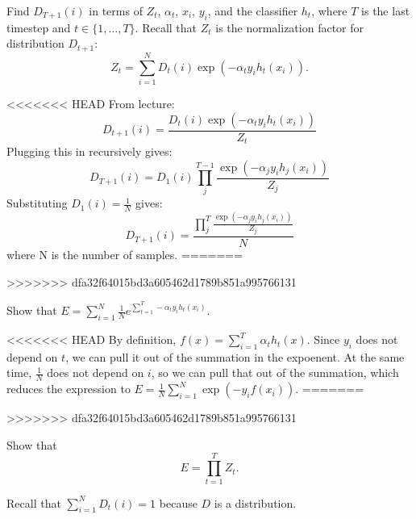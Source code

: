\problem[3]
Find $D_{T + 1}(i)$ in terms of $Z_t$, $\alpha_t$, $x_i$, $y_i$, and the classifier $h_t$, where $T$ is the last timestep and $t \in \{1, \ldots, T\}$. Recall that $Z_t$ is the normalization factor for distribution $D_{t+1}$:
$$Z_t = \sum\limits_{i=1}^N D_t(i) \exp(-\alpha_{t}y_{i}h_{t}(x_{i})).$$

\begin{solution}
<<<<<<< HEAD
     From lecture:
     \begin{equation}
         D_{t+1}(i) = \frac{D_t(i)\exp{(-\alpha_ty_ih_t(x_i))}}{Z_t}
     \end{equation}
     Plugging this in recursively gives:
    \begin{equation}
        D_{T+1}(i) =D_1(i)\prod_j^{T-1}\frac{\exp{(-\alpha_jy_ih_j(x_i))}}{Z_j}
    \end{equation}
    Substituting $D_1(i)=\frac{1}{N}$ gives:
    \begin{equation}
        D_{T+1}(i) =\frac{\prod_j^{T}\frac{\exp{(-\alpha_jy_ih_j(x_i))}}{Z_j}}{N}
    \end{equation}
    where N is the number of samples.
=======

>>>>>>> dfa32f64015bd3a605462d1789b851a995766131
\end{solution}

\problem[2]
Show that $E = \sum_{i=1}^N  \frac{1}{N} e^{\sum_{t=1}^T -\alpha_t y_i h_t(x_i)}.$

\begin{solution}
<<<<<<< HEAD
    By definition, $f(x) = \sum\limits_{i=1}^T \alpha_{t}h_t(x)$. Since $y_i$ does not depend on $t$, we can pull it out of the summation in the expoenent. At the same time, $\frac{1}{N}$ does not depend on $i$, so we can pull that out of the summation, which reduces the expression to $E = \frac{1}{N} \sum\limits_{i=1}^N \exp(-y_{i}f(x_i))$.
=======

>>>>>>> dfa32f64015bd3a605462d1789b851a995766131
\end{solution}

\problem[5]
Show that
$$E = \prod\limits_{t=1}^T Z_t.$$

\begin{hint}
	Recall that $\sum_{i = 1}^N D_t(i) = 1$ because $D$ is a distribution.
\end{hint}

